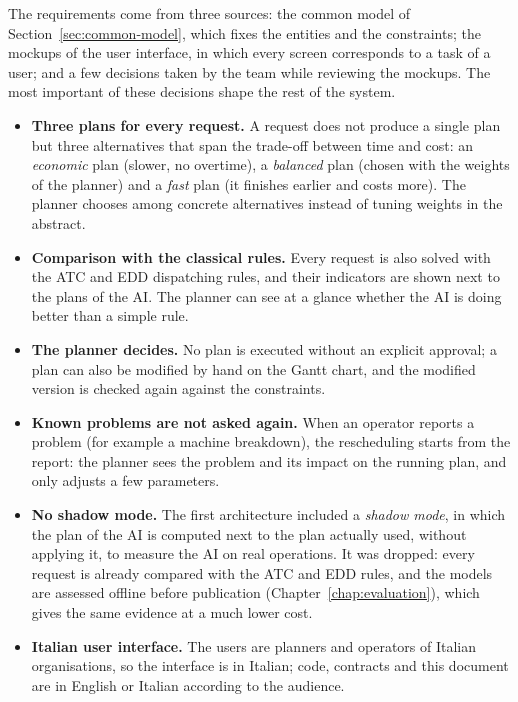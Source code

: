 The requirements come from three sources: the common model of
Section~\ref{sec:common-model}, which fixes the entities and the constraints; the mockups of
the user interface, in which every screen corresponds to a task of a user; and a few decisions
taken by the team while reviewing the mockups. The most important of these decisions shape the
rest of the system.
\begin{itemize}
  \item \textbf{Three plans for every request.} A request does not produce a single plan but
        three alternatives that span the trade-off between time and cost: an \emph{economic}
        plan (slower, no overtime), a \emph{balanced} plan (chosen with the weights of the
        planner) and a \emph{fast} plan (it finishes earlier and costs more). The planner
        chooses among concrete alternatives instead of tuning weights in the abstract.
  \item \textbf{Comparison with the classical rules.} Every request is also solved with the ATC
        and EDD dispatching rules, and their indicators are shown next to the plans of the AI.
        The planner can see at a glance whether the AI is doing better than a simple rule.
  \item \textbf{The planner decides.} No plan is executed without an explicit approval; a plan
        can also be modified by hand on the Gantt chart, and the modified version is checked
        again against the constraints.
  \item \textbf{Known problems are not asked again.} When an operator reports a problem (for
        example a machine breakdown), the rescheduling starts from the report: the planner sees
        the problem and its impact on the running plan, and only adjusts a few parameters.
  \item \textbf{No shadow mode.} The first architecture included a \emph{shadow mode}, in which
        the plan of the AI is computed next to the plan actually used, without applying it, to
        measure the AI on real operations. It was dropped: every request is already compared
        with the ATC and EDD rules, and the models are assessed offline before publication
        (Chapter~\ref{chap:evaluation}), which gives the same evidence at a much lower cost.
  \item \textbf{Italian user interface.} The users are planners and operators of Italian
        organisations, so the interface is in Italian; code, contracts and this document are in
        English or Italian according to the audience.
\end{itemize}

